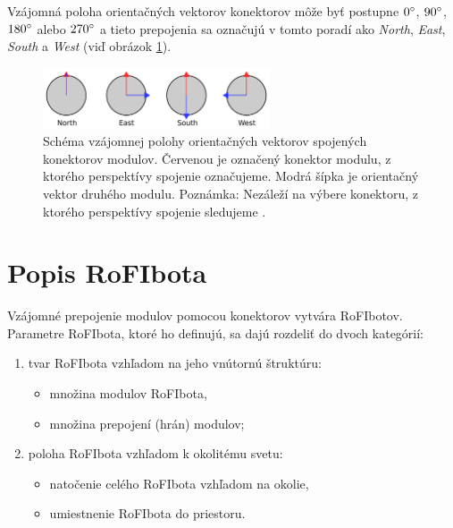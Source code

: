 \documentclass[
  printed, %
  oneside, %
  notable,   %
  nolof,     %
  nolot,     %
]{fithesis3}
\begin{document}
Vzájomná poloha orientačných vektorov konektorov môže byť postupne $0\degree$, $90\degree$, $180\degree$ alebo $270\degree$ a tieto prepojenia sa označujú v tomto poradí ako \textit{North}, \textit{East}, \textit{South} a \textit{West} (viď obrázok \ref{fig:dock_orientation}). 

\begin{figure}[hbt!]
    \centering
    \includegraphics[width=0.6\textwidth]{pictures/dock_orientation.pdf}
    \caption[Možné spôsoby prepojenia konektorov modulu]{Schéma vzájomnej polohy orientačných vektorov spojených konektorov modulov. Červenou je označený konektor modulu, z ktorého perspektívy spojenie označujeme. Modrá šípka je orientačný vektor druhého modulu. Poznámka: Nezáleží na výbere konektoru, z ktorého perspektívy spojenie sledujeme \cite{mrazekMasterThesis}.}
    \label{fig:dock_orientation}
\end{figure}

\section{Popis RoFIbota}
\label{sec:rofibotSpec}
Vzájomné prepojenie modulov pomocou konektorov vytvára RoFIbotov. Parametre RoFIbota, ktoré ho definujú, sa dajú rozdeliť do dvoch kategórií:   
\begin{enumerate}
    \item tvar RoFIbota vzhľadom na jeho vnútornú štruktúru:
    \begin{itemize}[topsep=-5pt]
        \item množina modulov RoFIbota, 
        \item množina prepojení (hrán) modulov; 
    \end{itemize}
    
    \item poloha RoFIbota vzhľadom k okolitému svetu: 
    \begin{itemize}[topsep=-5pt]
        \item natočenie celého RoFIbota vzhľadom na okolie, 
        \item umiestnenie RoFIbota do priestoru.  
    \end{itemize}
\end{enumerate}
\end{document}
